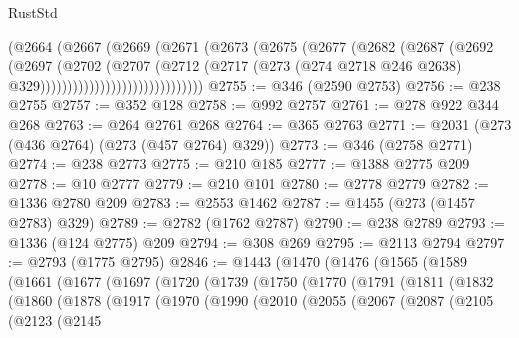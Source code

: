 \begin{lexlean}{RustStd}
\begin{coremodule}
{{{{{{{{{{{{{{{{{{{                                (@2664
                                  (@2667
                                    (@2669
                                      (@2671
                                        (@2673
                                          (@2675
                                            (@2677
                                              (@2682
                                                (@2687
                                                  (@2692
                                                    (@2697
                                                      (@2702
                                                        (@2707
                                                          (@2712
                                                            (@2717
                                                              (@273
                                                                (@274 @2718 @246 @2638)
                                                                @329))))))))))))))))))))))))))))))
@2755 := @346 (@2590 @2753)
@2756 := @238 @2755
@2757 := @352 @128
@2758 := @992 @2757
@2761 := @278 @922 @344 @268
@2763 := @264 @2761 @268
@2764 := @365 @2763
@2771 := @2031 (@273 (@436 @2764) (@273 (@457 @2764) @329))
@2773 := @346 (@2758 @2771)
@2774 := @238 @2773
@2775 := @210 @185
@2777 := @1388 @2775 @209
@2778 := @10 @2777
@2779 := @210 @101
@2780 := @2778 @2779
@2782 := @1336 @2780 @209
@2783 := @2553 @1462
@2787 := @1455 (@273 (@1457 @2783) @329)
@2789 := @2782 (@1762 @2787)
@2790 := @238 @2789
@2793 := @1336 (@124 @2775) @209
@2794 := @308 @269
@2795 := @2113 @2794
@2797 := @2793 (@1775 @2795)
@2846 := @1443
    (@1470
      (@1476
        (@1565
          (@1589
            (@1661
              (@1677
                (@1697
                  (@1720
                    (@1739
                      (@1750
                        (@1770
                          (@1791
                            (@1811
                              (@1832
                                (@1860
                                  (@1878
                                    (@1917
                                      (@1970
                                        (@1990
                                          (@2010
                                            (@2055
                                              (@2067
                                                (@2087
                                                  (@2105
                                                    (@2123
                                                      (@2145
}}}}}}}}}}}}}}}}}}}
\end{coremodule}
\end{lexlean}
